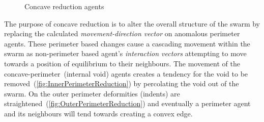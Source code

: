 \begin{figure}[H]
\centering
{}
\caption[Concave reduction agents]{Concave reduction agents}
\label{fig:ConcaveReductionAgents}
\end{figure}

The purpose of concave reduction is to alter the overall structure of the swarm by replacing the calculated \textit{movement-direction vector} on anomalous perimeter agents. These perimeter based changes cause a cascading movement within the swarm as non-perimeter based agent's \textit{interaction vectors} attempting to move towards a position of equilibrium to their neighbours. The movement of the concave-perimeter~(internal void) agents creates a tendency for the void to be removed~(\autoref{fig:InnerPerimeterReduction}) by percolating the void out of the swarm. On the outer perimeter deformities (indents) are straightened~(\autoref{fig:OuterPerimeterReduction}) and eventually a perimeter agent and its neighbours will tend towards creating a convex edge.

